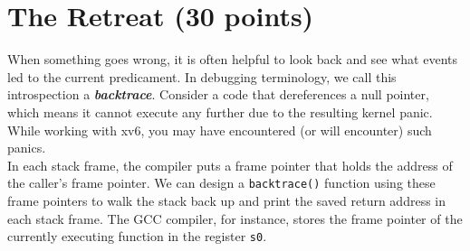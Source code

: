 \documentclass[11pt]{exam}
\begin{document}
\section{The Retreat (30 points)}

When something goes wrong, it is often helpful to look back and see what events led to the current predicament. In debugging terminology, we call this introspection a \textbf{{\em backtrace}}. Consider a code that dereferences a null pointer, which means it cannot execute any further due to the resulting kernel panic. While working with xv6, you may have encountered (or will encounter) such panics. \\

\noindent In each stack frame, the compiler puts a frame pointer that holds the address of the caller's frame pointer. We can design a \texttt{backtrace()} function using these frame pointers to walk the stack back up and print the saved return address in each stack frame. The GCC compiler, for instance, stores the frame pointer of the currently executing function in the register {\tt s0}. 
\end{document}
